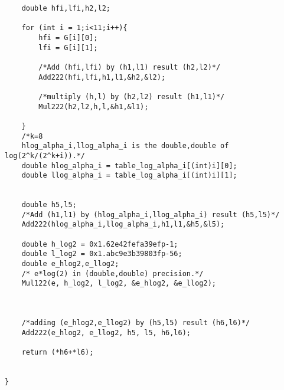 \begin{lstlisting}
    double hfi,lfi,h2,l2;

    for (int i = 1;i<11;i++){
        hfi = G[i][0];
        lfi = G[i][1];

        /*Add (hfi,lfi) by (h1,l1) result (h2,l2)*/
        Add222(hfi,lfi,h1,l1,&h2,&l2);

        /*multiply (h,l) by (h2,l2) result (h1,l1)*/
        Mul222(h2,l2,h,l,&h1,&l1);
       
    }
    /*k=8
    hlog_alpha_i,llog_alpha_i is the double,double of log(2^k/(2^k+i)).*/
    double hlog_alpha_i = table_log_alpha_i[(int)i][0];
    double llog_alpha_i = table_log_alpha_i[(int)i][1];


    double h5,l5;
    /*Add (h1,l1) by (hlog_alpha_i,llog_alpha_i) result (h5,l5)*/
    Add222(hlog_alpha_i,llog_alpha_i,h1,l1,&h5,&l5);
   
    double h_log2 = 0x1.62e42fefa39efp-1;
    double l_log2 = 0x1.abc9e3b39803fp-56;
    double e_hlog2,e_llog2;
    /* e*log(2) in (double,double) precision.*/
    Mul122(e, h_log2, l_log2, &e_hlog2, &e_llog2);
    
    

    /*adding (e_hlog2,e_llog2) by (h5,l5) result (h6,l6)*/
    Add222(e_hlog2, e_llog2, h5, l5, h6,l6);
    
    return (*h6+*l6);


}
\end{lstlisting}
\newpage

